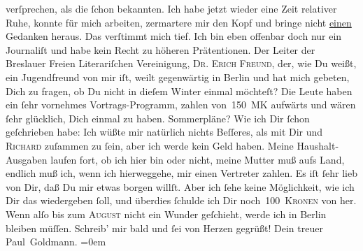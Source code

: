 \begin{ledgroupsized}[t]{13cm}
               verſprechen, als die ſchon bekannten.\pend
           \pstart
           Ich habe jetzt wieder eine Zeit relativer Ruhe, konnte für mich arbeiten, zermartere
               mir den Kopf und bringe nicht \uline{einen} Gedanken heraus.
               Das verſtimmt mich tief. Ich bin eben offenbar doch nur ein Journaliſt\strikeout{,} und habe kein Recht zu höheren Prätentionen.\pend
           \pstart
           Der Leiter der Breslauer Freien
                  Literariſchen Vereinigung, \textsc{Dr. Erich Freund}, der, wie Du weißt, ein Jugendfreund von mir iſt, weilt gegenwärtig in Berlin und hat mich gebeten, Dich {\pb}zu fragen, ob Du nicht in dieſem Winter einmal
                  \label{K_L02917-4v}\label{K_L02917-4h} möchteſt? Die Leute haben ein ſehr vornehmes Vortrags-Programm, zahlen von 150 \textsc{MK} aufwärts und wären ſehr glücklich, Dich einmal zu
               haben.\pend
           \pstart
           Sommerpläne? Wie ich Dir ſchon geſchrieben habe: Ich wüßte mir natürlich nichts
               Beſſeres, als mit Dir und \textsc{Richard} zuſammen zu ſein, aber ich werde kein Geld haben. Meine Haushalt-Ausgaben
               laufen fort, ob ich hier bin oder nicht, meine Mutter muß aufs Land, endlich muß ich, wenn ich hierweggehe, mir einen Vertreter zahlen. Es iſt ſehr
               lieb von Dir, daß Du mir etwas borgen willſt. Aber ich ſehe keine Möglichkeit, wie
               ich Dir das wiedergeben ſoll, und überdies ſchulde ich Dir noch 100 \textsc{Kronen} von \label{K_L02917-5v}\label{K_L02917-5h} her. Wenn alſo bis zum \textsc{Auguſt} nicht ein Wunder geſchieht, werde ich in Berlin bleiben müſſen.\pend
           \pstart
           Schreib’ mir bald und ſei von Herzen gegrüßt!\pend
           \pstart
           Dein treuer {\\[\baselineskip]}\spacefill\mbox{Paul Goldmann.}\pend
           \leftskip=0em{}
         

\end{ledgroupsized}
